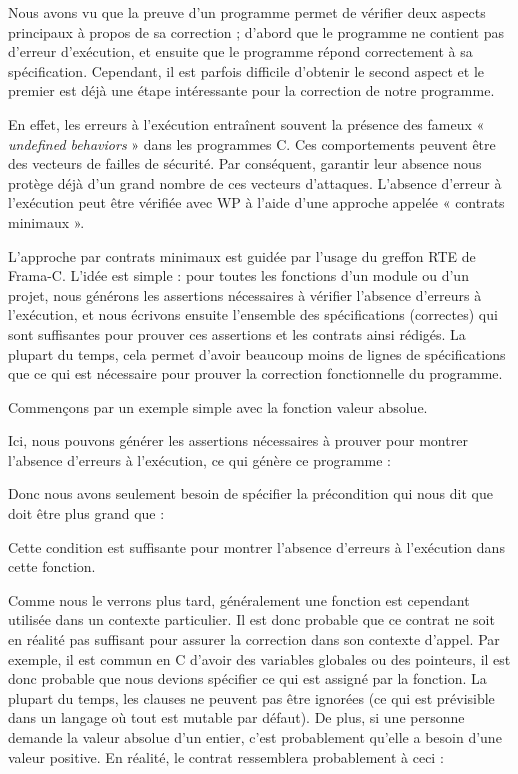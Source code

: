 Nous avons vu que la preuve d'un programme permet de vérifier deux aspects
principaux à propos de sa correction ; d'abord que le programme ne contient pas
d'erreur d'exécution, et ensuite que le programme répond correctement à sa
spécification. Cependant, il est parfois difficile d'obtenir le second aspect
et le premier est déjà une étape intéressante pour la correction de notre programme.


En effet, les erreurs à l'exécution entraînent souvent la présence des fameux
« \textit{undefined behaviors} » dans les programmes C. Ces comportements peuvent être
des vecteurs de failles de sécurité. Par conséquent, garantir leur absence nous
protège déjà d'un grand nombre de ces vecteurs d'attaques. L'absence d'erreur à
l'exécution peut être vérifiée avec WP à l'aide d'une approche appelée
« contrats minimaux ».




L'approche par contrats minimaux est guidée par l'usage du greffon RTE de Frama-C.
L'idée est simple : pour toutes les fonctions d'un module ou d'un projet,
nous générons les assertions nécessaires à vérifier l'absence d'erreurs à l'exécution,
et nous écrivons ensuite l'ensemble des spécifications (correctes) qui sont suffisantes
pour prouver ces assertions et les contrats ainsi rédigés. La plupart du temps, cela
permet d'avoir beaucoup moins de lignes de spécifications que ce qui est nécessaire
pour prouver la correction fonctionnelle du programme.


Commençons par un exemple simple avec la fonction valeur absolue.




Ici, nous pouvons générer les assertions nécessaires à prouver pour montrer
l'absence d'erreurs à l'exécution, ce qui génère ce programme :




Donc nous avons seulement besoin de spécifier la précondition qui nous dit que
 doit être plus grand que  :




Cette condition est suffisante pour montrer l'absence d'erreurs à l'exécution
dans cette fonction.


Comme nous le verrons plus tard, généralement une fonction est cependant utilisée
dans un contexte particulier. Il est donc probable que ce contrat ne soit en
réalité pas suffisant pour assurer la correction dans son contexte d'appel. Par
exemple, il est commun en C d'avoir des variables globales ou des pointeurs, il
est donc probable que nous devions spécifier ce qui est assigné par la fonction.
La plupart du temps, les clauses  ne peuvent pas être ignorées
(ce qui est prévisible dans un langage où tout est mutable par défaut). De plus,
si une personne demande la valeur absolue d'un entier, c'est probablement qu'elle
a besoin d'une valeur positive. En réalité, le contrat ressemblera probablement à
ceci :


